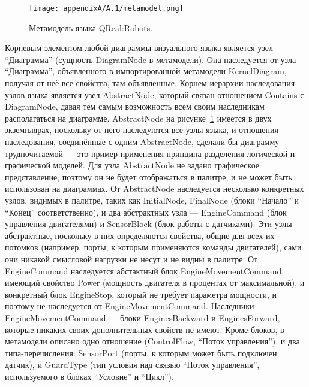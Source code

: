 \begin{figure} [ht]
	\begin{center}
		\texttt{[image: appendixA/A.1/metamodel.png]}
		\caption{Метамодель языка QReal:Robots.}
		\label{image:metamodel}
	\end{center}
\end{figure}

Корневым элементом любой диаграммы визуального языка является узел "`Диаграмма"' 
(сущность DiagramNode в метамодели). Она наследуется от узла "`Диаграмма"', объявленного 
в импортированной метамодели KernelDiagram, получая от неё все свойства, там объявленные. 
Корнем иерархии наследования узлов языка является узел AbstractNode, который связан 
отношением Contains с DiagramNode, давая тем самым возможность всем своим наследникам 
располагаться на диаграмме. AbstractNode на рисунке~\ref{image:metamodel} имеется 
в двух экземплярах, поскольку от него наследуются все узлы языка, и отношения наследования, 
соединённые с одним AbstractNode, сделали бы диаграмму трудночитаемой --- это пример 
применения принципа разделения логической и графической моделей. Для узла AbstractNode 
не задано графическое представление, поэтому он не будет отображаться в палитре, и 
не может быть использован на диаграммах. От AbstractNode наследуется несколько конкретных 
узлов, видимых в палитре, таких как InitialNode, FinalNode (блоки "`Начало"' и "`Конец"' 
соответственно), и два абстрактных узла --- EngineCommand (блок управления двигателями) 
и SensorBlock (блок работы с датчиками). Эти узлы абстрактные, поскольку в них определяются 
свойства, общие для всех их потомков (например, порты, к которым применяются команды 
двигателей), сами они никакой смысловой нагрузки не несут и не видны в палитре. От 
EngineCommand наследуется абстактный блок EngineMovementCommand, имеющий свойство 
Power (мощность двигателя в процентах от максимальной), и конкретный блок EngineStop, 
который не требует параметра мощности, и поэтому не наследуется от EngineMovementCommand. 
Наследники EngineMovementCommand --- блоки EnginesBackward и EnginesForward, которые 
никаких своих дополнительных свойств не имеют. Кроме блоков, в метамодели описано 
одно отношение (ControlFlow, "`Поток управления"'), и два типа-перечисления: SensorPort 
(порты, к которым может быть подключен датчик), и GuardType (тип условия над связью 
"`Поток управления"', используемого в блоках "`Условие"' и "`Цикл"').

